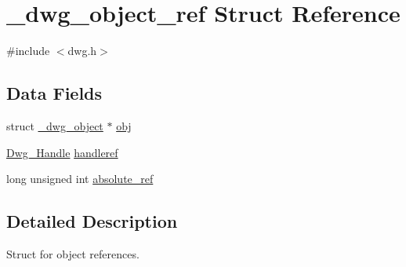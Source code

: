 \hypertarget{struct__dwg__object__ref}{\section{\-\_\-dwg\-\_\-object\-\_\-ref \-Struct \-Reference}
\label{struct__dwg__object__ref}
}


{\ttfamily \#include $<$dwg.\-h$>$}

\subsection*{\-Data \-Fields}
\begin{DoxyCompactItemize}
\item 
struct \hyperlink{struct__dwg__object}{\-\_\-dwg\-\_\-object} $\ast$ \hyperlink{struct__dwg__object__ref_a21349f90b54fb8ada1cf857a88c0f784}{obj}
\item 
\hyperlink{dwg_8h_abeae9f49b46e36263ebcece699cfc8ef}{\-Dwg\-\_\-\-Handle} \hyperlink{struct__dwg__object__ref_ae54a2bb37c877a32a0b942ae48525ae8}{handleref}
\item 
long unsigned int \hyperlink{struct__dwg__object__ref_a165ed48b878bbed103aa19b9524b12a2}{absolute\-\_\-ref}
\end{DoxyCompactItemize}


\subsection{\-Detailed \-Description}
\-Struct for object references. 

